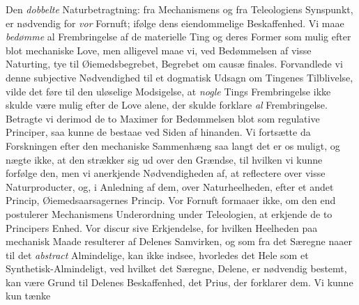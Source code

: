 \documentclass[12pt,a4paper]{book}
\begin{document}
Den \emph{dobbelte} Naturbetragtning: fra Mechanismens og
fra Teleologiens Synspunkt, er nødvendig for \emph{vor} Fornuft;
ifølge dens eiendommelige Beskaffenhed. Vi maae \emph{bedømme}
al Frembringelse af de materielle Ting og deres Former som
mulig efter blot mechaniske Love, men alligevel maae vi, ved
Bedømmelsen af visse Naturting, tye til Øiemedsbegrebet,
Begrebet om causæ finales. Forvandlede vi denne subjective
Nødvendighed til et dogmatisk Udsagn om Tingenes Tilblivelse,
vilde det føre til den uløselige Modsigelse, at \emph{nogle} Tings
Frembringelse ikke skulde være mulig efter de Love alene,
der skulde forklare \emph{al} Frembringelse. Betragte vi derimod
de to Maximer for Bedømmelsen blot som regulative Principer,
saa kunne de bestaae ved Siden af hinanden. Vi fortsætte da
Forskningen efter den mechaniske Sammenhæng saa langt det
er os muligt, og nægte ikke, at den strækker sig ud over den
Grændse, til hvilken vi kunne forfølge den, men vi anerkjende
Nødvendigheden af, at reflectere over visse Naturproducter, og,
i Anledning af dem, over Naturheelheden, efter et andet
Princip, Øiemedsaarsagernes Princip. Vor Fornuft formaaer
ikke, om den end postulerer Mechanismens Underordning under
Teleologien, at erkjende de to Principers Enhed. Vor discur\-%
sive Erkjendelse, for hvilken Heelheden paa mechanisk Maade
resulterer af Delenes Samvirken, og som fra det Særegne naaer
til det \emph{abstract} Almindelige, kan ikke indsee, hvorledes det
Hele som et Synthetisk-Almindeligt, ved hvilket det Særegne,
Delene, er nødvendig bestemt, kan være Grund til Delenes
Beskaffenhed, det Prius, der forklarer dem. Vi kunne kun tænke
\end{document}
